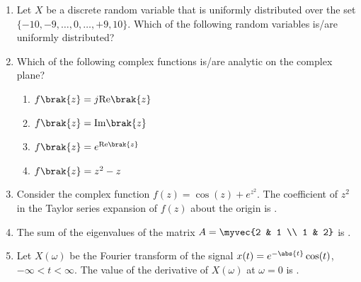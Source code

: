 \documentclass[journal,12pt,onecolumn]{IEEEtran}
\theoremstyle{remark}
\begin{document}
\begin{enumerate}[start=1, label=Q.\arabic*]
    \hfill{}

    \item Let $X$ be a discrete random variable that is uniformly distributed over the set $\{-10, -9, \dots, 0, \dots, +9, 10\}$. Which of the following random variables is/are uniformly distributed?
    \begin{enumerate}
    \end{enumerate}

    \hfill{}

    \item Which of the following complex functions is/are analytic on the complex plane?
    \begin{enumerate}
        \item $f\brak{z} = j\text{Re}\brak{z}$
        \item $f\brak{z} = \text{Im}\brak{z}$
        \item $f\brak{z} = e^{\text{Re}\brak{z}}$
        \item $f\brak{z} = z^2 - z$
    \end{enumerate}

    \hfill{}

    \item Consider the complex function $f(z) = \cos(z) + e^{z^2}$. The coefficient of $z^2$ in the Taylor series expansion of $f(z)$ about the origin is \underline{\hspace{2cm}} .

    \hfill{}

    \item The sum of the eigenvalues of the matrix $A = \myvec{2 & 1 \\ 1 & 2}$ is \underline{\hspace{2cm}} .

    \hfill{}

    \item Let $X(\omega)$ be the Fourier transform of the signal $x(t) = e^{-\abs{t}}\cos(t)$, $-\infty < t < \infty$. The value of the derivative of $X(\omega)$ at $\omega=0$ is \underline{\hspace{2cm}} .


\end{enumerate}
\end{document}
